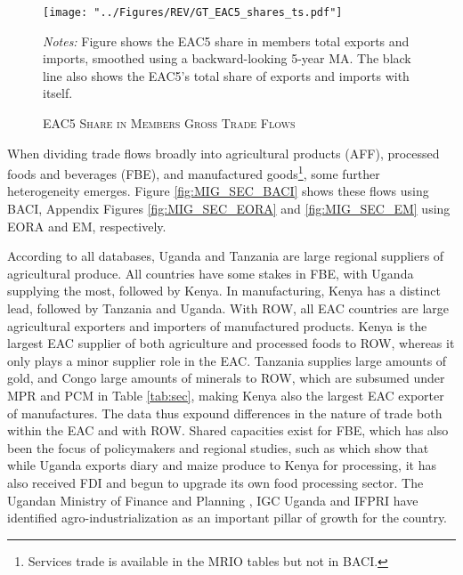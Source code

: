 \documentclass[a4paper]{article}
\begin{document}
\begin{figure}[h!] 
\centering
\caption{\label{fig:GTEACshares}\textsc{EAC5 Share in Members Gross Trade Flows}}
\texttt{[image: "../Figures/REV/GT\_EAC5\_shares\_ts.pdf"]} \\ 
\raggedright
\scriptsize 
\emph{Notes:} Figure shows the EAC5 share in members total exports and imports, smoothed using a backward-looking 5-year MA. The black line also shows the EAC5's total share of exports and imports with itself.
\end{figure}
\FloatBarrier

When dividing trade flows broadly into agricultural products (AFF), processed foods and beverages (FBE), and manufactured goods\footnote{Services trade is available in the MRIO tables but not in BACI.}, some further heterogeneity emerges. Figure \ref{fig:MIG_SEC_BACI} shows these flows using BACI, Appendix Figures \ref{fig:MIG_SEC_EORA} and \ref{fig:MIG_SEC_EM} using EORA and EM, respectively. \newline 

According to all databases, Uganda and Tanzania are large regional suppliers of agricultural produce. All countries have some stakes in FBE, with Uganda supplying the most, followed by Kenya. In manufacturing, Kenya has a distinct lead, followed by Tanzania and Uganda. With ROW, all EAC countries are large agricultural exporters and importers of manufactured products. Kenya is the largest EAC supplier of both agriculture and processed foods to ROW, whereas it only plays a minor supplier role in the EAC. Tanzania supplies large amounts of gold, and Congo large amounts of minerals to ROW, which are subsumed under MPR and PCM in Table \ref{tab:sec}, making Kenya also the largest EAC exporter of manufactures. The data thus expound differences in the nature of trade both within the EAC and with ROW. Shared capacities exist for FBE, which has also been the focus of policymakers and regional studies, such as \citet{Daly2017RVCs} which show that while Uganda exports diary and maize produce to Kenya for processing, it has also received FDI and begun to upgrade its own food processing sector. The Ugandan Ministry of Finance and Planning \citep{EGF21}, IGC Uganda \citep{fowler2019agro} and IFPRI \citep{van2020institutional} have identified agro-industrialization as an important pillar of growth for the country. 
\end{document}
